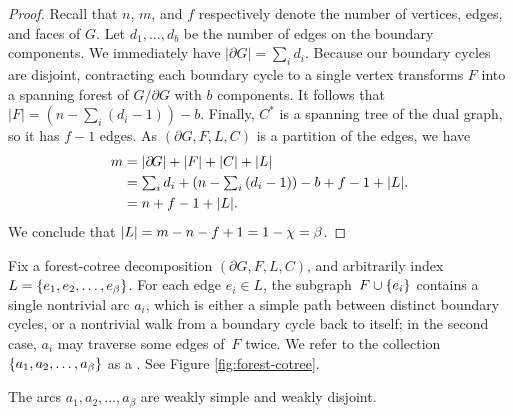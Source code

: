 \documentclass[letterpaper,review]{siamart190516}
\begin{document}
\begin{proof}
Recall that $n$, $m$, and $f$ respectively denote the number of vertices, edges, and faces of $G$.
Let $d_1, \ldots, d_b$ be the number of edges on the boundary components.  
We immediately have $|\partial\! G| = \sum_i {d_i}$.
Because our boundary cycles are disjoint, contracting each boundary cycle to a single vertex transforms $F$ into a spanning forest of $G / \partial\! G$ with $b$ components.  It follows that $|F| = (n - \sum_i{(d_i-1)}) - b$.  Finally, $C^*$ is a spanning tree of the dual graph, so it has $f-1$ edges.  As $(\partial\! G, F, L, C)$ is a partition of the edges, we have
\begin{align*}
	m &= \mathopen| \partial\! G \mathclose| + \mathopen| F \mathclose| + \mathopen| C \mathclose| + \mathopen| L \mathclose|
\\	&= \textstyle \sum_i d_i + (n - \sum_i{(d_i-1)}) - b + f-1 + \mathopen| L \mathclose|.
\\	&= n + f-1 + \mathopen| L \mathclose|.
\end{align*}
We conclude that $\mathopen| L \mathclose| = m - n - f + 1 = 1 - \chi = \beta$.
\end{proof}

Fix a forest-cotree decomposition $(\partial\! G, F, L, C)$, and arbitrarily index $L = \{ e_1, e_2, \dots, e_\beta \}$.  For each edge $e_i\in L$, the subgraph~$F\cup \{ e_i \}$ contains a single nontrivial arc $a_i$, which is either a simple path between distinct boundary cycles, or a nontrivial walk from a boundary cycle back to itself; in the second case, $a_i$ may traverse some edges of~$F$ twice.  We refer to the collection $\{ a_1, a_2, \dots, a_\beta \}$ as a .  See Figure \ref{fig:forest-cotree}.

\begin{lemma}
\label{L:weak}
The arcs $a_1, a_2, \dots, a_\beta$ are weakly simple and weakly disjoint.
\end{lemma}
\end{document}
